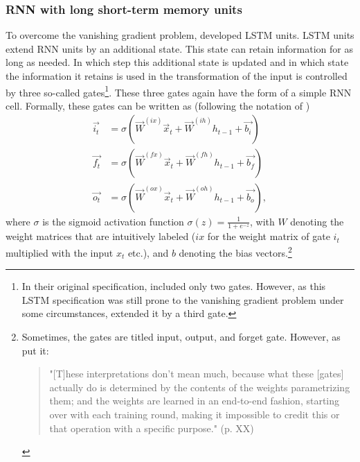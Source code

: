 \subsubsection{RNN with long short-term memory units}

To overcome the vanishing gradient problem, \citet{Hochreiter:1997} developed LSTM units. LSTM units extend RNN units by an additional state. This state can retain information for as long as needed. In which step this additional state is updated and in which state the information it retains is used in the transformation of the input is controlled by three so-called gates\footnote{In their original specification, \citet{Hochreiter:1997} included only two gates. However, as this LSTM specification was still prone to the vanishing gradient problem under some circumstances, \citet{Gers:2000} extended it by a third gate.}. These three gates again have the form of a simple RNN cell. Formally, these gates can be written as (following the notation of \citet{Lipton:2015})
%
\begin{equation} \label{LSTMgates}
\begin{split}
    \vec{i_t}&=\sigma\left(\vec{W}^{(ix)}\vec{x}_t+\vec{W}^{(ih)}h_{t-1}+\vec{b_i}\right)\\
    \vec{f_t}&=\sigma\left(\vec{W}^{(fx)}\vec{x}_t+\vec{W}^{(fh)}h_{t-1}+\vec{b_f}\right)\\
    \vec{o_t}&=\sigma\left(\vec{W}^{(ox)}\vec{x}_t+\vec{W}^{(oh)}h_{t-1}+\vec{b_o}\right),
\end{split}   
\end{equation}
%
where $\sigma$ is the sigmoid activation function $\sigma(z)=\frac{1}{1+e^{-z}}$, with $W$ denoting the weight matrices that are intuitively labeled ($ix$ for the weight matrix of gate $i_t$ multiplied with the input $x_t$ etc.), and $b$ denoting the bias vectors.\footnote{Sometimes, the gates are titled input, output, and forget gate. However, as \citet{chollet:2018} put it:
\begin{quote}
    "[T]hese interpretations don’t mean much, because what these [gates] actually do is determined by the contents of the weights parametrizing them; and the weights are learned in an end-to-end fashion, starting over with each training round, making it impossible to credit this or that operation with a specific purpose." (p. XX)
\end{quote}
}

